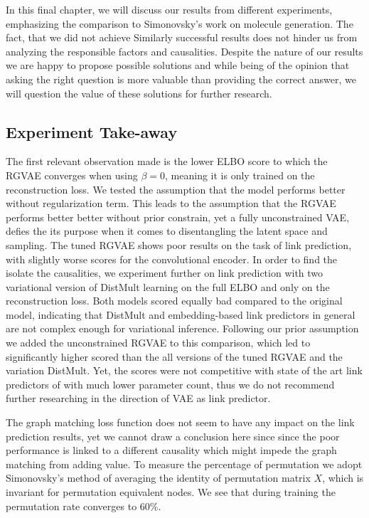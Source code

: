 

In this final chapter, we will discuss our results from different experiments, emphasizing the comparison to Simonovsky's work on molecule generation. The fact, that we did not achieve Similarly successful results does not hinder us from analyzing the responsible factors and causalities. Despite the nature of our results we are happy to propose possible solutions and while being of the opinion that asking the right question is more valuable than providing the correct answer, we will question the value of these solutions for further research.

\subsection{Experiment Take-away}


The first relevant observation made is the lower ELBO score to which the RGVAE converges when using $\beta=0$, meaning it is only trained on the reconstruction loss.
We tested the assumption that the model performs better without regularization term. This leads to the assumption that the RGVAE performs better better without prior constrain, yet a fully unconstrained VAE, defies the its purpose when it comes to disentangling the latent space and sampling.
The tuned RGVAE shows poor results on the task of link prediction, with slightly worse scores for the convolutional encoder. In order to find the isolate the causalities, we experiment further on link prediction with two variational version of DistMult learning on the full ELBO and only on the reconstruction loss. Both models scored equally bad compared to the original model, indicating that DistMult and embedding-based link predictors in general are not complex enough for variational inference. Following our prior assumption we added the unconstrained RGVAE to this comparison, which led to significantly higher scored than the all versions of the tuned RGVAE and the variation DistMult. Yet, the scores were not competitive with state of the art link predictors of with much lower parameter count, thus we do not recommend further researching in the direction of VAE as link predictor.

The graph matching loss function does not seem to have any impact on the link prediction results, yet we cannot draw a conclusion here since since the poor performance is linked to a different causality which might impede the graph matching from adding value. To measure the percentage of permutation we adopt Simonovsky's method of averaging the identity of permutation matrix $X$, which is invariant for permutation equivalent nodes. We see that during training the permutation rate converges to $60$\%.


